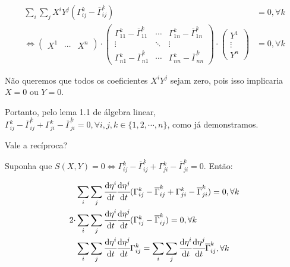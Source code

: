 \documentclass[10pt,a4paper]{article}
\begin{document}
		\begin{align*}
  		\sum_i \sum_j X^i Y^j ( \Gamma_{ij}^k - \overline{\Gamma}_{ij}^k ) &= 0, \forall k \\
		  \Leftrightarrow \left( \begin{matrix} X^1 & \cdots & X^n \end{matrix} \right) \cdot \left( \begin{matrix} \Gamma_{11}^k - \overline{\Gamma}_{11}^k & \cdots & \Gamma_{1n}^k - \overline{\Gamma}_{1n}^k \\ \vdots & \ddots & \vdots \\ \Gamma_{n1}^k - \overline{\Gamma}_{n1}^k & \cdots & \Gamma_{nn}^k - \overline{\Gamma}_{nn}^k \end{matrix} \right) \cdot \left( \begin{matrix} Y^1 \\ \vdots \\ Y^n \end{matrix} \right) &= 0, \forall k
		\end{align*}

		\vspace{100mm}

		N\~ao queremos que todos os coeficientes $X^i Y^j$ sejam zero, pois isso implicaria $X = 0$ ou $Y = 0$.

		Portanto, pelo lema 1.1 de \'algebra linear,	$\Gamma_{ij}^k - \overline{\Gamma}_{ij}^k + \Gamma_{ji}^k - \overline{\Gamma}_{ji}^k = 0, \forall i,j,k \in \{ 1, 2, \cdots, n \}$, como j\'a demonstramos.

		\vspace{12mm}

		Vale a rec\'iproca?

		Suponha que $S(X, Y) = 0 \Leftrightarrow \Gamma_{ij}^k - \overline{\Gamma}_{ij}^k + \Gamma_{ji}^k - \overline{\Gamma}_{ji}^k = 0$. Ent\~ao:

		\begin{align*}
		  &\sum_i \sum_j \cfrac{\mathrm{d} \eta^i}{\mathrm{d} t} \cfrac{\mathrm{d} \eta^j}{\mathrm{d} t} ( \Gamma_{ij}^k - \overline{\Gamma}_{ij}^k + \Gamma_{ji}^k - \overline{\Gamma}_{ji}^k ) = 0, \forall k \\
		  2 \cdot &\sum_i \sum_j \cfrac{\mathrm{d} \eta^i}{\mathrm{d} t} \cfrac{\mathrm{d} \eta^j}{\mathrm{d} t} ( \Gamma_{ij}^k - \overline{\Gamma}_{ij}^k ) = 0, \forall k \\
		  &\sum_i \sum_j \cfrac{\mathrm{d} \eta^i}{\mathrm{d} t} \cfrac{\mathrm{d} \eta^j}{\mathrm{d} t} \Gamma_{ij}^k = \sum_i \sum_j \cfrac{\mathrm{d} \eta^i}{\mathrm{d} t} \cfrac{\mathrm{d} \eta^j}{\mathrm{d} t} \overline{\Gamma}_{ij}^k, \forall k
		\end{align*}
\end{document}
